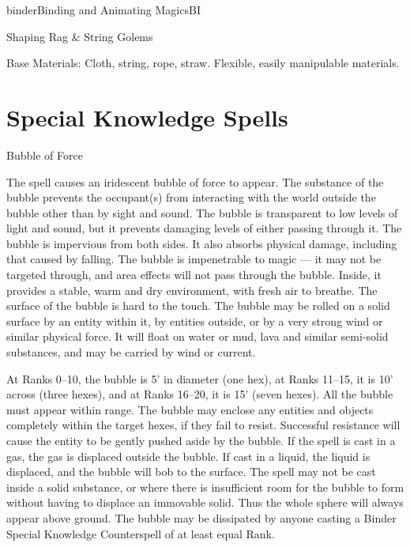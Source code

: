 \begin{College}[1.2]{binder}{Binding and Animating Magics}{BI}
\begin{ritual}[Q-4]{Shaping Rag \& String Golems}
\begin{effects}
Base Materials: Cloth, string, rope, straw. Flexible, easily
manipulable materials.
\end{effects}
\end{ritual}

\section{Special Knowledge Spells}

\begin{spell}[S-1]{Bubble of Force}
\begin{effects}
The spell causes an iridescent bubble of force to appear.  The
substance of the bubble prevents the occupant(s) from interacting with
the world outside the bubble other than by sight and sound.  The
bubble is transparent to low levels of light and sound, but it
prevents damaging levels of either passing through it. The bubble is
impervious from both sides.  It also absorbs physical damage,
including that caused by falling.  The bubble is impenetrable to magic
--- it may not be targeted through, and area effects will not pass
through the bubble.  Inside, it provides a stable, warm and dry
environment, with fresh air to breathe. The surface of the bubble is
hard to the touch. The bubble may be rolled on a solid surface by an
entity within it, by entities outside, or by a very strong wind or
similar physical force.  It will float on water or mud, lava and
similar semi-solid substances, and may be carried by wind or current.

At Ranks 0--10, the bubble is 5’ in diameter (one hex), at Ranks
11--15, it is 10’ across (three hexes), and at Ranks 16--20, it is 15’
(seven hexes).  All the bubble must appear within range.  The bubble
may enclose any entities and objects completely within the target
hexes, if they fail to resist.  Successful resistance will cause the
entity to be gently pushed aside by the bubble.  If the spell is cast
in a gas, the gas is displaced outside the bubble.  If cast in a
liquid, the liquid is displaced, and the bubble will bob to the
surface.  The spell may not be cast inside a solid substance, or where
there is insufficient room for the bubble to form without having to
displace an immovable solid.  Thus the whole sphere will always appear
above ground.  The bubble may be dissipated by anyone casting a Binder
Special Knowledge Counterspell of at least equal Rank.
\end{effects}
\end{spell}


\end{College}
